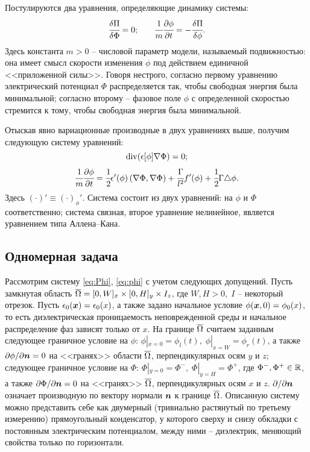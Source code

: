 Постулируются два уравнения, определяющие динамику системы:
$$\cfrac{\delta \Pi}{\delta \Phi} = 0 {\text{;}} \qquad \cfrac{1}{m} \cfrac{\partial \phi}{\partial t} = -\cfrac{\delta \Pi}{\delta \phi} {\text{.}}$$
Здесь константа $m > 0$ -- числовой параметр модели, называемый подвижностью: она имеет смысл скорости изменения $\phi$ под действием единичной <<приложенной силы>>. Говоря нестрого, согласно первому уравнению электрический потенциал $\Phi$ распределяется так, чтобы свободная энергия была минимальной; согласно второму -- фазовое поле $\phi$ с определенной скоростью стремится к тому, чтобы свободная энергия была минимальной.

Отыскав явно вариационные производные в двух уравнениях выше, получим следующую систему уравнений:
\begin{equation}
	\operatorname{{div}}(\epsilon[\phi] \nabla \Phi) = 0 {\text{;}}
	\label{eq:Phi}
\end{equation}
\begin{equation}
	\cfrac{1}{m} \cfrac{\partial \phi}{\partial t} = \cfrac{1}{2} \epsilon'(\phi) \left( \nabla \Phi, \nabla \Phi \right) + \cfrac{\Gamma}{l^2} f'(\phi) + \cfrac{1}{2} \Gamma \triangle \phi {\text{.}}
	\label{eq:phi}
\end{equation}
Здесь $(\cdot)' \equiv (\cdot)_\phi'$. Система состоит из двух уравнений: на $\phi$ и $\Phi$ соответственно; система связная, второе уравнение нелинейное, является уравнением типа Аллена--Кана.


\subsection{Одномерная задача}

Рассмотрим систему \eqref{eq:Phi}, \eqref{eq:phi} с учетом следующих допущений. Пусть замкнутая область ${\overline{\Omega}} = [0, W]_x \times [0, H]_y \times I_z$, где $W, H > 0, \; I$ -- некоторый отрезок. Пусть $\epsilon_0({\boldsymbol{x}}) = \epsilon_0(x)$, а также задано начальное условие $\phi({\boldsymbol{x}}, 0) = \phi_0(x)$, то есть диэлектрическая проницаемость неповрежденной среды и начальное распределение фаз зависят только от $x$. На границе ${\overline{\Omega}}$ считаем заданным следующее граничное условие на $\phi$: $\phi|_{x = 0} = \phi_l(t), \; \phi|_{x = W} = \phi_r(t)$, а также $\partial \phi / \partial {\boldsymbol{n}}= 0$ на <<гранях>> области ${\overline{\Omega}}$, перпендикулярных осям $y$ и $z$; следующее граничное условие на $\Phi$: $\Phi|_{y = 0} = \Phi^-, \; \Phi|_{y = H} = \Phi^+$, где $\Phi^-, \Phi^+ \in {\mathbb{R}}$, а также $\partial \Phi / \partial {\boldsymbol{n}} = 0$ на <<гранях>> ${\overline{\Omega}}$, перпендикулярных осям $x$ и $z$. $\partial  / \partial {\boldsymbol{n}}$ означает производную по вектору нормали ${\boldsymbol{n}}$ к границе ${\overline{\Omega}}$. Описанную систему можно представить себе как двумерный (тривиально растянутый по третьему измерению) прямоугольный конденсатор, у которого сверху и снизу обкладки с постоянным электрическим потенциалом, между ними -- диэлектрик, меняющий свойства только по горизонтали.

